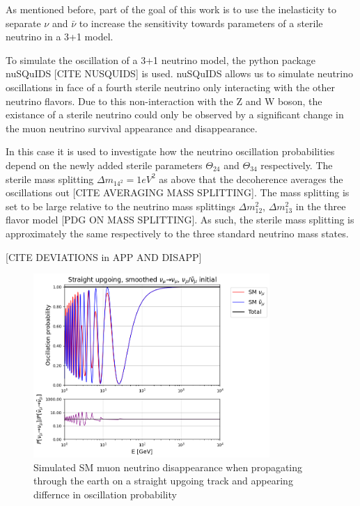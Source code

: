\documentclass[a4paper,12pt,numbered]{article}
\begin{document}
As mentioned before, part of the goal of this work is to use the inelasticity to separate $\nu$ and $\bar{\nu}$ to increase the sensitivity towards parameters of a sterile neutrino in a 3+1 model.

To simulate the oscillation of a 3+1 neutrino model, the python package nuSQuIDS [CITE NUSQUIDS] is used. nuSQuIDS allows us to simulate neutrino oscillations in face of a fourth sterile neutrino only interacting with the other neutrino flavors. Due to this non-interaction with the Z and W boson, the existance of a sterile neutrino could only be observed by a significant change in the muon neutrino survival appearance and disappearance.


In this case it is used to investigate how the neutrino oscillation probabilities depend on the newly added sterile parameters $\Theta_{24}$ and $\Theta_{34}$ respectively. The sterile mass splitting $\Delta m_{14^2}=1 eV^2$ as above that the decoherence averages the oscillations out [CITE AVERAGING MASS SPLITTING]. The mass splitting is set to be large relative to the neutrino mass splittings $\Delta m_{12}^2$, $\Delta m_{13}^2$ in the three flavor model [PDG ON MASS SPLITTING]. As such, the sterile mass splitting is approximately the same respectively to the three standard neutrino mass states.

[CITE DEVIATIONS in APP AND DISAPP]

\begin{figure}[H]
\centering
\includegraphics[width=0.8\textwidth]{Graphics/SterileOscParameters/0.087_SM_smoothed_osc_ratio_mu.png}
\caption{Simulated SM muon neutrino disappearance when propagating through the earth on a straight upgoing track and appearing differnce in oscillation probability}
\end{figure}
\end{document}
